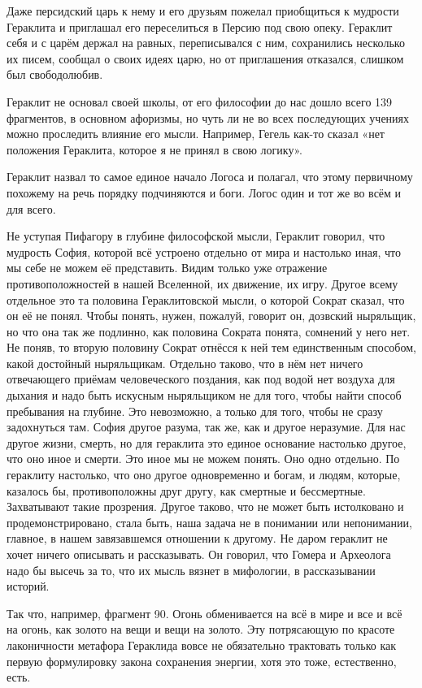 Даже персидский царь к нему и его друзьям пожелал приобщиться к
мудрости Гераклита и приглашал его переселиться в Персию под свою опеку.
Гераклит себя и с царём держал на равных, переписывался с ним, сохранились
несколько их писем, сообщал о своих идеях царю, но от приглашения отказался,
слишком был свободолюбив. 

Гераклит не основал своей школы, от его философии до
нас дошло всего 139 фрагментов, в основном афоризмы, но чуть ли не во всех
последующих учениях можно проследить влияние его мысли. Например, Гегель как-то
сказал «нет положения Гераклита, которое я не принял в свою логику». 

Гераклит назвал то самое единое начало Логоса и полагал, что этому первичному похожему на речь порядку подчиняются и боги. Логос один и тот же во всём и для всего. 

Не уступая Пифагору в глубине философской мысли, Гераклит говорил, что мудрость
София, которой всё устроено отдельно от мира и настолько иная, что мы себе не
можем её представить. Видим только уже отражение противоположностей в нашей
Вселенной, их движение, их игру. Другое всему отдельное это та половина
Гераклитовской мысли, о которой Сократ сказал, что он её не понял. Чтобы понять,
нужен, пожалуй, говорит он, дозвский ныряльщик, но что она так же подлинно, как
половина Сократа понята, сомнений у него нет. Не поняв, то вторую половину
Сократ отнёсся к ней тем единственным способом, какой достойный ныряльщикам.
Отдельно таково, что в нём нет ничего отвечающего приёмам человеческого
поздания, как под водой нет воздуха для дыхания и надо быть искусным ныряльщиком
не для того, чтобы найти способ пребывания на глубине. Это невозможно, а только
для того, чтобы не сразу задохнуться там. София другое разума, так же, как и
другое неразумие. Для нас другое жизни, смерть, но для гераклита это единое
основание настолько другое, что оно иное и смерти. Это иное мы не можем понять.
Оно одно отдельно. По гераклиту настолько, что оно другое одновременно и богам,
и людям, которые, казалось бы, противоположны друг другу, как смертные и
бессмертные. Захватывают такие прозрения. Другое таково, что не может быть
истолковано и продемонстрировано, стала быть, наша задача не в понимании или
непонимании, главное, в нашем завязавшемся отношении к другому. Не даром
гераклит не хочет ничего описывать и рассказывать. Он говорил, что Гомера и
Археолога надо бы высечь за то, что их мысль вязнет в мифологии, в рассказывании
историй. 

Так что, например, фрагмент 90. Огонь обменивается на всё в мире и все
и всё на огонь, как золото на вещи и вещи на золото. Эту потрясающую по красоте
лаконичности метафора Гераклида вовсе не обязательно трактовать только как
первую формулировку закона сохранения энергии, хотя это тоже, естественно, есть.

